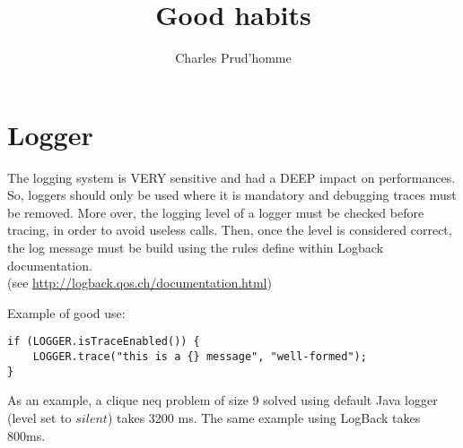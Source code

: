 \documentclass[11pt]{article}
\title{Good habits}
\author{Charles Prud'homme}
\begin{document}
\maketitle
\section{Logger}
The logging system is VERY sensitive and had a DEEP impact on performances. So, loggers should only be used where it is mandatory and debugging traces must be removed.
More over, the logging level of a logger must be checked before tracing, in order to avoid useless calls. Then, once the level is considered correct, the log message must be build using the rules define within Logback documentation. \\(see \url{http://logback.qos.ch/documentation.html})

Example of good use:
\begin{lstlisting}
if (LOGGER.isTraceEnabled()) {
	LOGGER.trace("this is a {} message", "well-formed");
}
\end{lstlisting}
As an example, a clique neq problem of size 9 solved using default Java logger (level set to $silent$) takes 3200 ms. The same example using LogBack takes 800ms.
\end{document}
